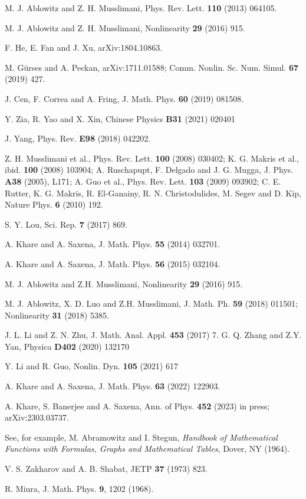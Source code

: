 \documentclass[11pt]{article}
\begin{document}
\begin{thebibliography}{99}

 M. J. Ablowitz and Z. H. Musslimani, Phys. Rev. Lett. 
{\bf 110} (2013) 064105.

 M. J. Ablowitz and Z. H. Musslimani, Nonlinearity {\bf 29}
(2016) 915.

 F. He, E. Fan and J. Xu, arXiv:1804.10863.

 M. G\"urses and A. Peckan, arXiv:1711.01588; Comm. Nonlin.
Sc. Num. Simul. {\bf 67} (2019) 427.

 J. Cen, F. Correa and A. Fring, J. Math. Phys. {\bf 60}
(2019) 081508.

 Y. Zia, R. Yao and X. Xin, Chinese Physics {\bf B31} 
(2021) 020401

 J. Yang, Phys. Rev. {\bf E98} (2018) 042202.

 Z. H. Musslimani et al., Phys. Rev. Lett. {\bf 100}
(2008) 030402; K. G. Makris et al., ibid. {\bf 100} (2008) 103904; 
A. Ruschapupt, F. Delgado and J. G. Mugga, J. Phys. {\bf A38} (2005), 
L171; A. Guo et al., Phys. Rev. Lett. {\bf 103} (2009) 093902; C. E.
Rutter, K. G. Makris, R. El-Ganainy, R. N. Christodulides, M. Segev 
and D. Kip, Nature Phys. {\bf 6} (2010) 192. 

 S. Y. Lou, Sci.  Rep. {\bf 7} (2017) 869. 

 A. Khare and A. Saxena, J. Math. Phys. {\bf 55} (2014) 
032701.

 A. Khare and A. Saxena, J. Math. Phys. {\bf 56} (2015) 
032104.


 M. J. Ablowitz and Z.H. Musslimani, Nonlinearity {\bf 29} 
(2016) 915.

 M. J. Ablowitz, X. D. Luo and Z.H. Musslimani, J. Math. Ph.
{\bf 59} (2018) 011501; Nonlinearity {\bf 31} (2018) 5385.

 J. L. Li and Z. N. Zhu, J. Math. Anal. Appl. {\bf 453} 
(2017) 7.
 G. Q. Zhang and Z.Y. Yan, Physica {\bf D402} (2020) 132170

 Y. Li and R. Guo, Nonlin. Dyn. {\bf 105} (2021) 617 

 A. Khare and A. Saxena, J. Math. Phys. {\bf 63} (2022) 122903.

 A. Khare, S. Banerjee and A. Saxena, Ann. of Phys. 
{\bf 452} (2023) in press; arXiv:2303.03737. 

 See, for example, M. Abramowitz and I. Stegun, {\it Handbook of 
Mathematical Functions with Formulas, Graphs and Mathematical Tables}, Dover,
NY (1964).

 V. S. Zakharov and A. B. Shabat, JETP {\bf 37} (1973) 823.

 R. Miura, J. Math. Phys. {\bf 9}, 1202 (1968). 

\end{thebibliography}

\end{document}
